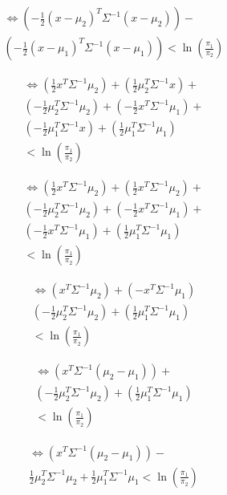 \documentclass{article}
\begin{document}
\begin{multicols}{2}
\[
\begin{split}
\iff 
\left(-\frac{1}{2}(x - \mu_2)^T \Sigma^{-1} (x - \mu_2) \right) - \\ 
\left(-\frac{1}{2}(x - \mu_1)^T \Sigma^{-1} (x - \mu_1) \right) < \ln \left(\frac{\pi_1}{\pi_2} \right)
\end{split}
\]

\[
\begin{split}
\iff 
\left(\frac{1}{2} x^T \Sigma^{-1}\mu_2 \right) + \left(\frac{1}{2} \mu_2^T \Sigma^{-1} x \right) + \\
\left(-\frac{1}{2} \mu_2^T \Sigma^{-1} \mu_2 \right) + \left(-\frac{1}{2} x^T \Sigma^{-1} \mu_1 \right) + \\
\left(-\frac{1}{2} \mu_1^T \Sigma^{-1} x \right) + \left(\frac{1}{2} \mu_1^T \Sigma^{-1} \mu_1 \right) \\
< \ln \left(\frac{\pi_1}{\pi_2} \right)
\end{split}
\]

\[
\begin{split}
\iff 
\left(\frac{1}{2} x^T \Sigma^{-1}\mu_2 \right) + \left(\frac{1}{2} x^T \Sigma^{-1} \mu_2 \right) + \\
\left(-\frac{1}{2} \mu_2^T \Sigma^{-1} \mu_2 \right) + \left(-\frac{1}{2} x^T \Sigma^{-1} \mu_1 \right) + \\
\left(-\frac{1}{2} x^T \Sigma^{-1} \mu_1 \right) + \left(\frac{1}{2} \mu_1^T \Sigma^{-1} \mu_1 \right) \\
< \ln \left(\frac{\pi_1}{\pi_2} \right)
\end{split}
\]

\[
\begin{split}
\iff 
\left(x^T \Sigma^{-1}\mu_2 \right) + \left(-x^T \Sigma^{-1} \mu_1 \right) \\
\left(-\frac{1}{2} \mu_2^T \Sigma^{-1} \mu_2 \right) + \left(\frac{1}{2} \mu_1^T \Sigma^{-1} \mu_1 \right) \\
< \ln \left(\frac{\pi_1}{\pi_2} \right)
\end{split}
\]

\[
\begin{split}
\iff 
\left(x^T \Sigma^{-1} ( \mu_2 - \mu_1 ) \right) + \\
\left(-\frac{1}{2} \mu_2^T \Sigma^{-1} \mu_2 \right) + \left(\frac{1}{2} \mu_1^T \Sigma^{-1} \mu_1 \right) \\
< \ln \left(\frac{\pi_1}{\pi_2} \right)
\end{split}
\]

\[
\begin{split}
\iff 
\left(x^T \Sigma^{-1} ( \mu_2 - \mu_1 ) \right) - \\
\frac{1}{2}\mu_2^T \Sigma^{-1} \mu_2 + \frac{1}{2}\mu_1^T \Sigma^{-1} \mu_1 < \ln \left(\frac{\pi_1}{\pi_2} \right)
\end{split}
\]


\end{multicols}
\end{document}
